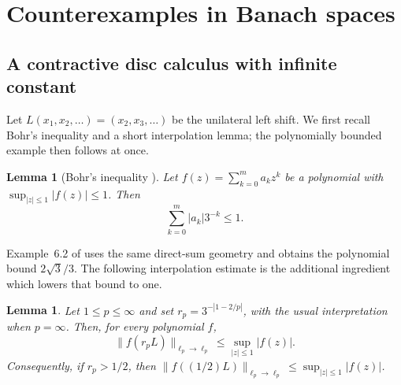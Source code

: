 \documentclass[a4paper]{amsart}
\newtheorem{lemma}[theorem]{Lemma}
\theoremstyle{remark}
\begin{document}
\section{Counterexamples in Banach spaces}\label{sec:counterexamples}

\subsection{A contractive disc calculus with infinite constant}\label{sec:polynomially-bounded}

Let $L(x_1,x_2,\ldots)=(x_2,x_3,\ldots)$ be the unilateral left shift.  We first recall Bohr's inequality and a short interpolation lemma; the polynomially bounded example then follows at once.

\begin{lemma}[Bohr's inequality \cite{Bohr}]\label{lem:bohr}
Let $f(z)=\sum_{k=0}^m a_kz^k$ be a polynomial with $\sup_{|z|\leqslant1}|f(z)|\leqslant1$.  Then
\[
       \sum_{k=0}^m |a_k|3^{-k}\leqslant1.
\]
\end{lemma}

Example~6.2 of \cite{BHDVW} uses the same direct-sum geometry and obtains the polynomial bound $2\sqrt3/3$.  The following interpolation estimate is the additional ingredient which lowers that bound to one.

\begin{lemma}\label{lem:interpolation}
Let $1\leqslant p\leqslant\infty$ and set $r_p=3^{-|1-2/p|}$, with the usual interpretation when $p=\infty$.  Then, for every polynomial $f$,
\[
       \|f(r_pL)\|_{\ell_p\to\ell_p}\leqslant\sup_{|z|\leqslant1}|f(z)|.
\]
Consequently, if $r_p>1/2$, then $\|f((1/2)L)\|_{\ell_p\to\ell_p}\leqslant\sup_{|z|\leqslant1}|f(z)|$.
\end{lemma}
\end{document}
